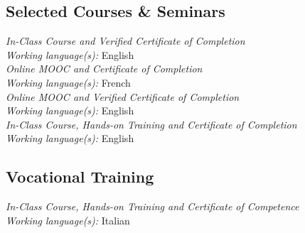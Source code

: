 \documentclass[
  a4paper, 
]{fortysecondscv}
\begin{document}
\subsection{Selected Courses \& Seminars}
\begin{cvtable}
		{{\small\emph{\small In-Class Course and Verified Certificate of Completion}\\\textit{\small Working language(s):} English}\\[-0.8em]}
		{{\small\emph{\small Online MOOC and Certificate of Completion}\\\textit{\small Working language(s):} French}\\[-0.8em]}
		{{\small\emph{\small Online MOOC and Verified Certificate of Completion}\\\textit{\small Working language(s):} English}\\[-0.8em]}
		{{\small\emph{\small In-Class Course, Hands-on Training and Certificate of Completion}\\\textit{\small Working language(s):} English}}
\end{cvtable}
\subsection{Vocational Training}
\begin{cvtable}
		{{\small\emph{\small In-Class Course, Hands-on Training and Certificate of Competence}\\\textit{\small Working language(s):} Italian}}
\end{cvtable}


\newpage
\end{document}
